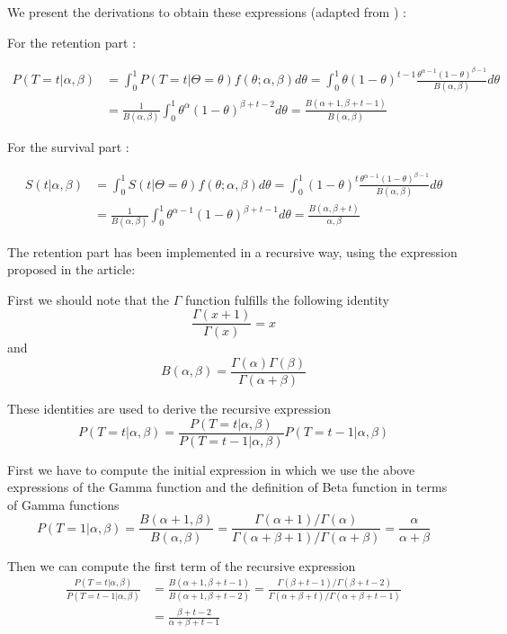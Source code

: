 \documentclass[paper=a4, fontsize=11pt]{scrartcl} %
\numberwithin{equation}{section} %
\numberwithin{figure}{section} %
\numberwithin{table}{section} %
\begin{document}
We present the derivations to obtain these expressions (adapted from \cite{feder07} ) :

For the retention part : 

\begin{align*}
P(T=t | \alpha,\beta) &= \int_0^1 P(T=t | \Theta = \theta)f(\theta ;  \alpha,\beta) d\theta = 
\int_0^1 \theta (1-\theta)^{t-1}  \frac{\theta^{\alpha-1}(1-\theta)^{\beta-1}}{B(\alpha,\beta)} d\theta \\
&=\frac{1}{B(\alpha,\beta)}  \int_0^1 \theta^{\alpha}(1-\theta)^{\beta+t-2}d\theta
= \frac{B(\alpha+1,\beta+t-1)}{B(\alpha,\beta)}
\end{align*} 

For the survival part : 

\begin{align*}
S(t | \alpha,\beta) &= \int_0^1 S(t | \Theta = \theta)f(\theta ;  \alpha,\beta) d\theta = 
\int_0^1  (1-\theta)^{t}  \frac{\theta^{\alpha-1}(1-\theta)^{\beta-1}}{B(\alpha,\beta)} d\theta \\
&=\frac{1}{B(\alpha,\beta)}  \int_0^1 \theta^{\alpha-1}(1-\theta)^{\beta+t-1}d\theta
= \frac{B(\alpha,\beta+t)}{\alpha,\beta}
\end{align*} 

The retention part has been implemented in a recursive way, using the expression proposed in the article: 

First we should note that the $\Gamma$ function fulfills the following identity\\
$$
\frac{\Gamma(x+1)}{\Gamma(x)}=x
$$
and
$$
B(\alpha,\beta)=\frac{\Gamma(\alpha)\Gamma(\beta)}{\Gamma(\alpha + \beta)}
$$

These identities are used to derive the recursive expression\\
$$
P(T = t | \alpha,\beta) = \frac{P(T = t | \alpha,\beta)}{P(T = t -1| \alpha,\beta)}P(T = t-1 | \alpha,\beta)
$$

First we have to compute the initial expression in which we use the above expressions of the Gamma function and the definition of Beta function in terms of Gamma functions\\
$$
P(T = 1 | \alpha,\beta) =\frac{B(\alpha+1,\beta)}{B(\alpha,\beta)} = \frac{\Gamma(\alpha + 1)/\Gamma(\alpha)}{\Gamma(\alpha + \beta +1)/\Gamma(\alpha + \beta)} = \frac{\alpha}{\alpha + \beta} 
$$

Then we can compute the first term of the recursive expression\\
\begin{align*}
 \frac{P(T = t | \alpha,\beta)}{P(T = t -1| \alpha,\beta)} &= \frac{B(\alpha+1,\beta+t-1)}{B(\alpha+1,\beta+t-2)} =  \frac{\Gamma(\beta + t - 1)/\Gamma(\beta + t -2)}{\Gamma(\alpha + \beta +t)/\Gamma(\alpha + \beta + t -1)} \\ &= \frac{\beta+t-2}{\alpha+\beta+t-1} 
\end{align*}
\end{document}
